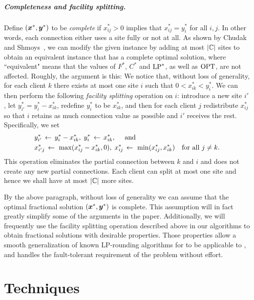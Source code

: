 \documentclass[oneside,final]{ucr}
\begin{document}
\paragraph{Completeness and facility splitting.}
Define $(\boldsymbol{x}^\ast, \boldsymbol{y}^\ast)$ to be \emph{complete} if
$x_{ij}^\ast>0$ implies that $x_{ij}^\ast=y_i^\ast$ for all $i,j$. In
other words, each connection either uses a site fully or not at all.
As shown by Chudak and Shmoys~\cite{ChudakS04}, we can modify the
given instance by adding at most $|\mathbb{C}|$ sites to obtain an
equivalent instance that has a complete optimal solution, where
``equivalent" means that the values of $F^\ast$, $C^\ast$ and
$\mbox{\rm LP}^\ast$, as well as $\mbox{\rm OPT}$, are not affected. Roughly, the argument
is this: We notice that, without loss of generality, for each client
$k$ there exists at most one site $i$ such that $0 < x_{ik}^\ast <
y_i^\ast$.  We can then perform the following \emph{facility
  splitting} operation on $i$: introduce a new site $i'$, let
$y^\ast_{i'} = y^\ast_i - x^\ast_{ik}$, redefine $y^\ast_i$ to be
$x^\ast_{ik}$, and then for each client $j$ redistribute $x^\ast_{ij}$
so that $i$ retains as much connection value as possible and $i'$
receives the rest. Specifically, we set
%
\begin{align*}
  &y^\ast_{i'} \;{\,\leftarrow\,}\; y^\ast_i - x^\ast_{ik},\;   y^\ast_{i} \;{\,\leftarrow\,}\; x^\ast_{ik}, \quad \text{ and }\\
  &x^\ast_{i'j} \;{\,\leftarrow\,}\;\max( x^\ast_{ij} - x^\ast_{ik}, 0 ),\;	 x^\ast_{ij} \;{\,\leftarrow\,}\; \min( x^\ast_{ij} , x^\ast_{ik}) 
			\quad	\textrm{for all}\ j \neq k.
\end{align*}
%
This operation eliminates the partial connection between $k$
and $i$ and does not create any new partial
connections. Each client can split at most one site and
hence we shall have at most $|\mathbb{C}|$ more sites.

By the above paragraph, without loss of generality we can
assume that the optimal fractional solution $(\boldsymbol{x}^\ast,
\boldsymbol{y}^\ast)$ is complete. This assumption will in fact
greatly simplify some of the arguments in the
paper. Additionally, we will frequently use the facility
splitting operation described above in our algorithms to
obtain fractional solutions with desirable properties. Those
properties allow a smooth generalization of known
LP-rounding algorithms for {\UFL} to be applicable to
{\FTFP}, and handles the fault-tolerant requirement of the
problem without effort.


\chapter{Techniques} \label{ch: techniques} 
\end{document}

